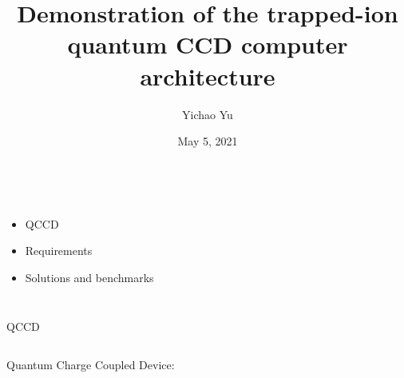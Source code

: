 \documentclass[xcolor={table}]{beamer}
\title{Demonstration of the trapped-ion quantum CCD computer architecture}
\date{May 5, 2021}
\author{Yichao Yu}
\institute{Ni Group}
\begin{document}
\begin{frame}{}
  \titlepage
\end{frame}


\begin{frame}{}
  \begin{center}
    \begin{columns}
      \column{9cm}
      \begin{itemize}
      \item QCCD
      \item Requirements
      \item Solutions and benchmarks
      \end{itemize}
    \end{columns}
  \end{center}
\end{frame}

\begin{frame}{QCCD}
  \begin{center}
    \begin{columns}
      \column{8cm}
      \begin{center}
        Quantum Charge Coupled Device:\\\vspace{0.5cm}
      \end{center}
    \end{columns}
  \end{center}
\end{frame}
\end{document}

